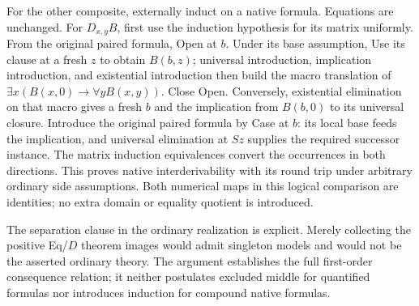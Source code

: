 For the other composite, externally induct on a native formula. Equations
are unchanged. For $D_{x,y}B$, first use the induction hypothesis for its
matrix uniformly. From the original paired formula, Open at $b$. Under
its base assumption, Use its clause at a fresh $z$ to obtain $B(b,z)$;
universal introduction, implication introduction, and existential
introduction then build the macro translation of
$\exists x(B(x,0)\to\forall yB(x,y))$. Close Open.
Conversely, existential elimination on that macro gives a fresh $b$ and
the implication from $B(b,0)$ to its universal closure. Introduce the
original paired formula by Case at $b$: its local base feeds the implication,
and universal elimination at $Sz$ supplies the required successor instance.
The matrix induction equivalences convert the occurrences in both directions.
This proves native interderivability with its round trip under arbitrary
ordinary side assumptions. Both numerical maps in this logical comparison
are identities; no extra domain or equality quotient is introduced.

The separation clause in the ordinary realization is explicit. Merely
collecting the positive Eq/$D$ theorem images would admit singleton models
and would not be the asserted ordinary theory. The argument establishes the
full first-order consequence relation; it neither postulates excluded middle
for quantified formulas nor introduces induction for compound native formulas.
